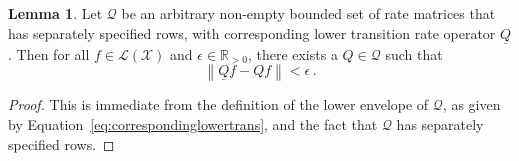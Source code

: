 \documentclass[10pt,a4paper]{paper}
\theoremstyle{definition}
\newtheorem{lemma}[theorem]{Lemma}
\newcommand{\reals}{\mathbb{R}}
\newcommand{\realspos}{\reals_{>0}}
\newcommand{\states}{\mathcal{X}}
\newcommand{\gambles}{\mathcal{L}}
\newcommand{\gamblesX}{\gambles(\states)}
\newcommand{\rateset}{\mathcal{Q}}
\newcommand{\lrate}{\underline{Q}}
\newcommand{\norm}[1]{\left\lVert #1 \right\rVert}
\begin{document}
\begin{lemma}\label{lemma:rateset_has_arginf}
Let $\rateset$ be an arbitrary non-empty bounded set of rate matrices that has separately specified rows, with corresponding lower transition rate operator $\lrate$. Then for all $f\in\gamblesX$ and $\epsilon\in\realspos$, there exists a $Q\in\rateset$ such that
\begin{equation*}
\norm{\lrate f - Qf} < \epsilon\,.
\end{equation*}
\end{lemma}
\begin{proof}
This is immediate from the definition of the lower envelope of $\rateset$, as given by Equation~\eqref{eq:correspondinglowertrans}, and the fact that $\rateset$ has separately specified rows.
\end{proof}
\end{document}
